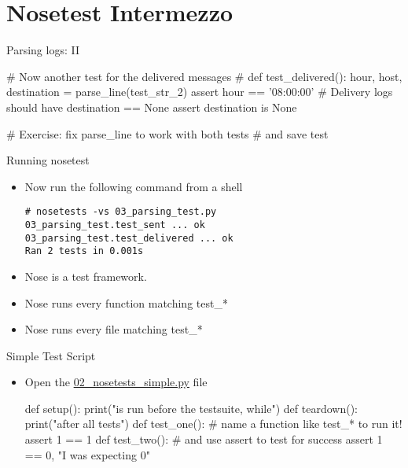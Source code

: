 \section{Nosetest Intermezzo}


\begin{pyframe}{Parsing logs: II}
\begin{pycode}
# Now another test for the delivered messages
#  %
def test_delivered():
    hour, host, destination = parse_line(test_str_2)
    assert hour == '08:00:00'
    # Delivery logs should have destination == None
    assert destination is None

# Exercise: fix parse_line to work with both tests
#  and save test
\end{pycode}
\end{pyframe}


\begin{pyframe}{Running nosetest}
\begin{itemize}
\item Now run the following command from a shell

\begin{verbatim}
# nosetests -vs 03_parsing_test.py  
03_parsing_test.test_sent ... ok        
03_parsing_test.test_delivered ... ok 
Ran 2 tests in 0.001s                 
\end{verbatim}
\item Nose is a test framework.
\item Nose runs every function matching test\_*
\item Nose runs every file matching test\_*
\end{itemize}
\end{pyframe}

\begin{pyframe}{Simple Test Script}
\begin{itemize}
\item Open the \href{https://github.com/ioggstream/python-course/blob/master/python-for-sysadmin/02\_nosetests\_simple.py}{02\_nosetests\_simple.py} file
\begin{pycode}
def setup():
    print("is run before the testsuite, while")
def teardown():
    print("after all tests")
def test_one():
    # name a function like test_* to run it!
    assert 1 == 1 
def test_two():
    # and use assert to test for success
    assert 1 == 0, "I was expecting 0" 
\end{pycode}
\end{itemize}
\end{pyframe}

